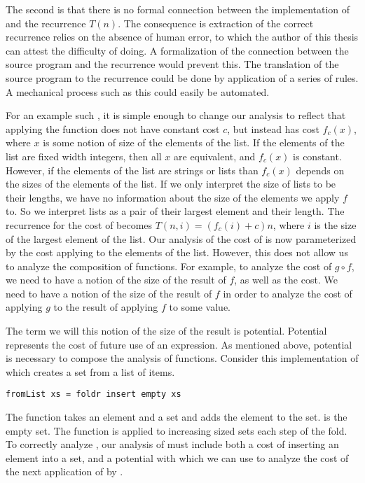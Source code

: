 The second is that there is no formal connection between the implementation of
 and the recurrence $T(n)$. The consequence is extraction of the correct
recurrence relies on the absence of human error, to which the author of this
thesis can attest the difficulty of doing. A formalization of the connection
between the source program and the recurrence would prevent this. The
translation of the source program to the recurrence could be done by
application of a series of rules. A mechanical process such as this could
easily be automated.



For an example such , it is simple enough to change our analysis to
reflect that applying the function  does not have constant cost $c$, but
instead has cost $f_c(x)$, where $x$ is some notion of size of the elements of
the list. If the elements of the list are fixed width integers, then all $x$
are equivalent, and $f_c(x)$ is constant. However, if the elements of the list
are strings or lists than $f_c(x)$ depends on the sizes of the elements of the
list.  If we only interpret the size of lists to be their lengths, we have no
information about the size of the elements we apply $f$ to. So we interpret
lists as a pair of their largest element and their length. The recurrence for
the cost of  becomes $T(n,i) = (f_c(i) + c)n$, where $i$ is the size of
the largest element of the list. Our analysis of the cost of  is now
parameterized by the cost applying  to the elements of the list. However,
this does not allow us to analyze the composition of functions. For example, to
analyze the cost of $g \circ f$, we need to have a notion of the size of the
result of $f$, as well as the cost. We need to have a notion of the size of the
result of $f$ in order to analyze the cost of applying $g$ to the result of
applying $f$ to some value.


The term we will this notion of the size of the result is potential. Potential
represents the cost of future use of an expression. As mentioned above,
potential is necessary to compose the analysis of functions. Consider this
implementation of  which creates a set from a list of items.
%
\begin{lstlisting}
fromList xs = foldr insert empty xs
\end{lstlisting}
%
The  function takes an element and a set and adds the element to the
set.  is the empty set. The  function is applied to
increasing sized sets each step of the fold. To correctly analyze ,
our analysis of  must include both a cost of inserting an element
into a set, and a potential with which we can use to analyze the cost of the
next application of  by .



